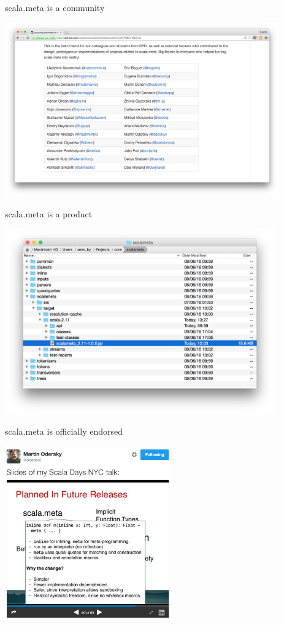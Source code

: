 \documentclass[svgnames,dvipsnames,hyperref={bookmarks=false},usepdftitle=false]{beamer}
\begin{document}
\begin{frame}{scala.meta is a community}
\vskip20pt
\begin{center}
\includegraphics[height=7.5cm]{is-a-community.png}
\end{center}
\end{frame}

\begin{frame}{scala.meta is a product}
\vskip20pt
\begin{center}
\includegraphics[height=8cm]{is-a-product.png}
\end{center}
\end{frame}

\begin{frame}{scala.meta is officially endorsed}
\vskip20pt
\begin{center}
\includegraphics[height=7.5cm]{is-officially-endorsed.png}
\end{center}
\end{frame}
\end{document}
